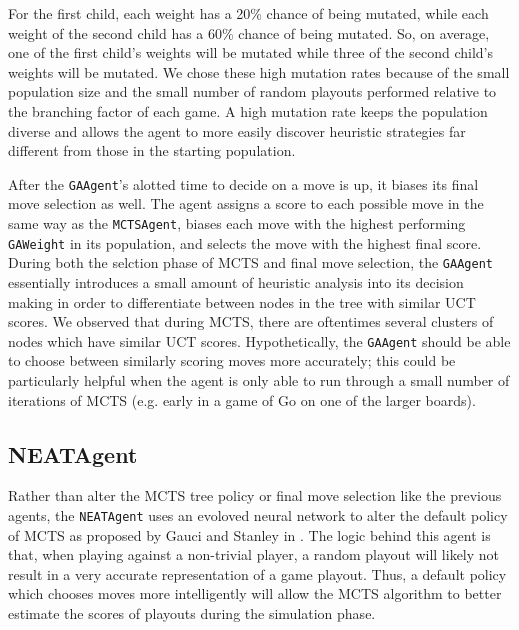For the first child, each weight has a 20\% chance of being mutated, while each weight of the second child has a 60\% chance of being mutated.  So, on average, one of the first child's weights will be mutated while three of the second child's weights will be mutated.  We chose these high mutation rates because of the small population size and the small number of random playouts performed relative to the branching factor of each game.  A high mutation rate keeps the population diverse and allows the agent to more easily discover heuristic strategies far different from those in the starting population.

After the \texttt{GAAgent}'s alotted time to decide on a move is up, it biases its final move selection as well.  The agent assigns a score to each possible move in the same way as the \texttt{MCTSAgent}, biases each move with the highest performing \texttt{GAWeight} in its population, and selects the move with the highest final score.  During both the selction phase of MCTS and final move selection, the \texttt{GAAgent} essentially introduces a small amount of heuristic analysis into its decision making in order to differentiate between nodes in the tree with similar UCT scores.  We observed that during MCTS, there are oftentimes several clusters of nodes which have similar UCT scores.  Hypothetically, the \texttt{GAAgent} should be able to choose between similarly scoring moves more accurately; this could be particularly helpful when the agent is only able to run through a small number of iterations of MCTS (e.g. early in a game of Go on one of the larger boards).

\subsection{NEATAgent}
Rather than alter the MCTS tree policy or final move selection like the previous agents, the \texttt{NEATAgent} uses an evoloved neural network to alter the default policy of MCTS as proposed by Gauci and Stanley in \cite{hyperneatgo}.  The logic behind this agent is that, when playing against a non-trivial player, a random playout will likely not result in a very accurate representation of a game playout.  Thus, a default policy which chooses moves more intelligently will allow the MCTS algorithm to better estimate the scores of playouts during the simulation phase.

